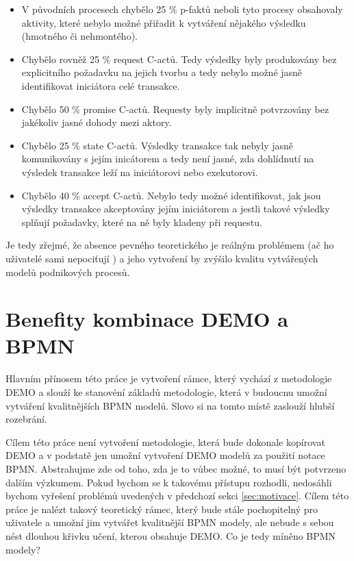 \documentclass[]{article}
\begin{document}
\begin{itemize}
\item V původních procesech chybělo 25 \% p-faktů neboli tyto procesy obsahovaly aktivity, které nebylo možné přiřadit k vytváření nějakého výsledku (hmotného či nehmontého).
\item Chybělo rovněž 25 \% request C-actů. Tedy výsledky byly produkovány bez explicitního požadavku na jejich tvorbu a tedy nebylo možné jasně identifikovat iniciátora celé transakce.
\item Chybělo 50 \% promise C-actů. Requesty byly implicitně potvrzovány bez jakékoliv jasné dohody mezi aktory.
\item Chybělo 25 \% state C-actů. Výsledky transakce tak nebyly jasně komunikovány s jejím inicátorem a tedy není jasné, zda dohlídnutí na výsledek transakce leží na iniciátorovi nebo exekutorovi.
\item Chybělo 40 \% accept C-actů. Nebylo tedy možné identifikovat, jak jsou výsledky transakce akceptovány jejím iniciátorem a jestli takové výsledky splňují požadavky, které na ně byly kladeny při requestu.
\end{itemize}

Je tedy zřejmé, že absence pevného teoretického je reálným problémem (ač ho uživatelé sami nepociťují \cite{VanNuffel2009}) a jeho vytvoření by zvýšilo kvalitu vytvářených modelů podnikových procesů.

\section{Benefity kombinace DEMO a BPMN}
Hlavním přínosem této práce je vytvoření rámce, který vychází z metodologie DEMO a slouží ke stanovéní základů metodologie, která v budoucnu umožní vytváření kvalitnějších BPMN modelů. Slovo  si na tomto místě zaslouží hlubší rozebrání.

Cílem této práce není vytvoření metodologie, která bude dokonale kopírovat DEMO a v podstatě jen umožní vytvoření DEMO modelů za použití notace BPMN. Abstrahujme zde od toho, zda je to vůbec možné, to musí být potvrzeno dalším výzkumem. Pokud bychom se k takovému přístupu rozhodli, nedosáhli bychom vyřešení problémů uvedených v předchozí sekci \ref{sec:motivace}. Cílem této práce je nalézt takový teoretický rámec, který bude stále pochopitelný pro uživatele a umožní jim vytvářet kvalitnější BPMN modely, ale nebude s sebou nést dlouhou křivku učení, kterou obsahuje DEMO. Co je tedy míněno  BPMN modely?
\end{document}
